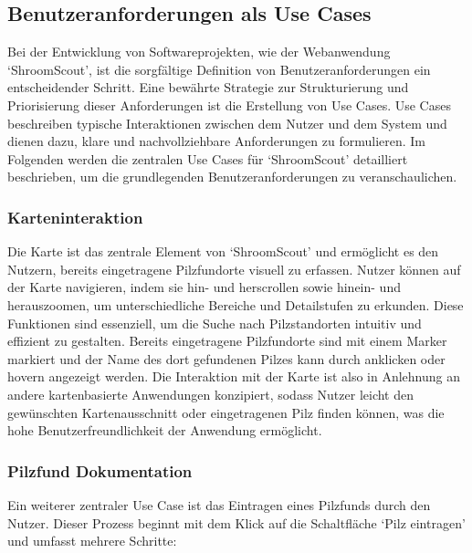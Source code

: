 \documentclass[../main.tex]{subfiles} %
\begin{document}
\subsection{Benutzeranforderungen als Use Cases} %

Bei der Entwicklung von Softwareprojekten, wie der Webanwendung `ShroomScout', ist die sorgfältige Definition von
Benutzeranforderungen ein entscheidender Schritt. Eine bewährte Strategie zur Strukturierung und Priorisierung dieser
Anforderungen ist die Erstellung von Use Cases. Use Cases beschreiben typische Interaktionen zwischen dem Nutzer und
dem System und dienen dazu, klare und nachvollziehbare Anforderungen zu formulieren. Im Folgenden werden die zentralen
Use Cases für `ShroomScout' detailliert beschrieben, um die grundlegenden Benutzeranforderungen zu veranschaulichen.

\subsubsection{Karteninteraktion}

Die Karte ist das zentrale Element von `ShroomScout' und ermöglicht es den Nutzern, bereits eingetragene Pilzfundorte
visuell zu erfassen. Nutzer können auf der Karte navigieren, indem sie hin- und herscrollen sowie hinein- und herauszoomen,
um unterschiedliche Bereiche und Detailstufen zu erkunden. Diese Funktionen sind essenziell, um die Suche nach Pilzstandorten
intuitiv und effizient zu gestalten. Bereits eingetragene Pilzfundorte sind mit einem Marker markiert und der Name des dort
gefundenen Pilzes kann durch anklicken oder hovern angezeigt werden. Die Interaktion mit der Karte ist also in Anlehnung an
andere kartenbasierte Anwendungen konzipiert, sodass Nutzer leicht den gewünschten Kartenausschnitt oder eingetragenen Pilz
finden können, was die hohe Benutzerfreundlichkeit der Anwendung ermöglicht.

\subsubsection{Pilzfund Dokumentation}

Ein weiterer zentraler Use Case ist das Eintragen eines Pilzfunds durch den Nutzer. Dieser Prozess beginnt mit dem Klick
auf die Schaltfläche `Pilz eintragen' und umfasst mehrere Schritte:
\end{document}
